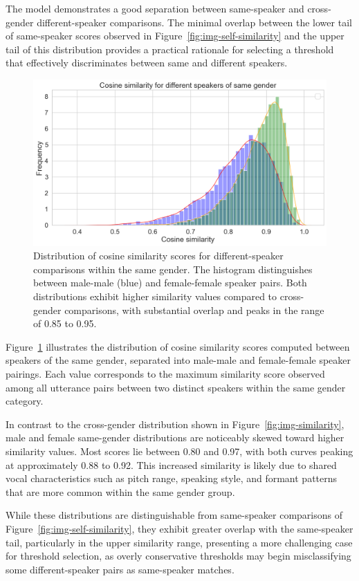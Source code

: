 \documentclass[conference]{IEEEtran}
\begin{document}
The model demonstrates a good separation between same-speaker and cross-gender different-speaker comparisons. The minimal overlap between the lower tail of same-speaker scores observed in Figure~\ref{fig:img-self-similarity} and the upper tail of this distribution provides a practical rationale for selecting a threshold that effectively discriminates between same and different speakers.

\begin{figure}[H]
	\centering
	\includegraphics[width=0.7\linewidth]{img/img-similarity-same-gender}
	\caption{Distribution of cosine similarity scores for different-speaker comparisons within the same gender. The histogram distinguishes between male-male (blue) and female-female speaker pairs. Both distributions exhibit higher similarity values compared to cross-gender comparisons, with substantial overlap and peaks in the range of 0.85 to 0.95.}	
	\label{fig:img-similarity-same-gender}
\end{figure}

Figure~\ref{fig:img-similarity-same-gender} illustrates the distribution of cosine similarity scores computed between speakers of the same gender, separated into male-male and female-female speaker pairings. Each value corresponds to the maximum similarity score observed among all utterance pairs between two distinct speakers within the same gender category.

In contrast to the cross-gender distribution shown in Figure~\ref{fig:img-similarity}, male and female same-gender distributions are noticeably skewed toward higher similarity values. Most scores lie between 0.80 and 0.97, with both curves peaking at approximately 0.88 to 0.92. This increased similarity is likely due to shared vocal characteristics such as pitch range, speaking style, and formant patterns that are more common within the same gender group.

While these distributions are distinguishable from same-speaker comparisons of Figure~\ref{fig:img-self-similarity}, they exhibit greater overlap with the same-speaker tail, particularly in the upper similarity range, presenting a more challenging case for threshold selection, as overly conservative thresholds may begin misclassifying some different-speaker pairs as same-speaker matches.
\end{document}
